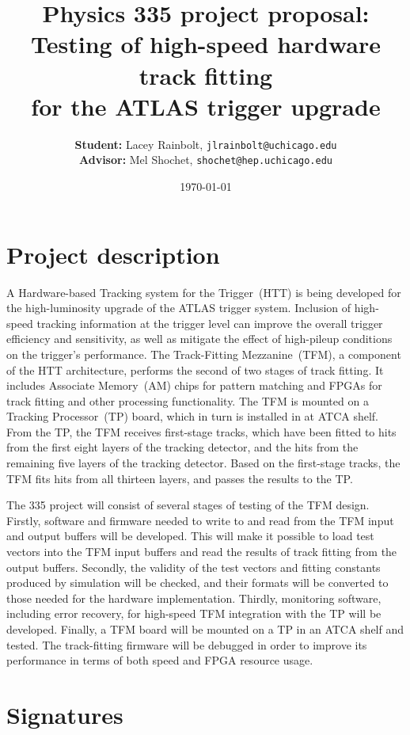 \documentclass[12pt]{article}
\title{\Large \vspace{-6ex}
	Physics 335 project proposal: \\
	Testing of high-speed hardware track fitting \\ for the ATLAS trigger upgrade}
\author{\textbf{Student:} Lacey Rainbolt, \texttt{jlrainbolt@uchicago.edu} \\ \textbf{Advisor:} Mel Shochet, \texttt{shochet@hep.uchicago.edu}}
\date{\today}
\begin{document}
\maketitle

\section*{Project description}

A Hardware-based Tracking system for the Trigger~(HTT) is being developed for the high-luminosity upgrade of the ATLAS trigger system.  Inclusion of high-speed tracking information at the trigger level can improve the overall trigger efficiency and sensitivity, as well as mitigate the effect of high-pileup conditions on the trigger's performance.  The Track-Fitting Mezzanine~(TFM), a component of the HTT architecture, performs the second of two stages of track fitting.  It includes Associate Memory~(AM) chips for pattern matching and FPGAs for track fitting and other processing functionality.  The TFM is mounted on a Tracking Processor~(TP) board, which in turn is installed in at ATCA shelf.  From the TP, the TFM receives first-stage tracks, which have been fitted to hits from the first eight layers of the tracking detector, and the hits from the remaining five layers of the tracking detector.  Based on the first-stage tracks, the TFM fits hits from all thirteen layers, and passes the results to the TP.

The 335 project will consist of several stages of testing of the TFM design.  Firstly, software and firmware needed to write to and read from the TFM input and output buffers will be developed.  This will make it possible to load test vectors into the TFM input buffers and read the results of track fitting from the output buffers.  Secondly, the validity of the test vectors and fitting constants produced by simulation will be checked, and their formats will be converted to those needed for the hardware implementation.  Thirdly, monitoring software, including error recovery, for high-speed TFM integration with the TP will be developed.  Finally, a TFM board will be mounted on a TP in an ATCA shelf and tested.  The track-fitting firmware will be debugged in order to improve its performance in terms of both speed and FPGA resource usage.

\section*{Signatures}
\end{document}
